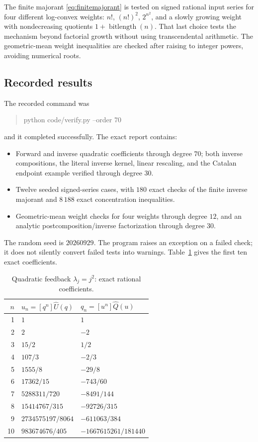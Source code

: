 \documentclass[11pt,a4paper]{article}
\numberwithin{equation}{section}
\theoremstyle{definition}
\theoremstyle{remark}
\newcommand{\Q}{\widehat Q}
\newcommand{\U}{\widehat U}
\begin{document}
The finite majorant \eqref{eq:finitemajorant} is tested on signed rational
input series for four different log-convex weights: $n!$, $(n!)^2$,
$2^{n^2}$, and a slowly growing weight with nondecreasing quotients
$1+\operatorname{bitlength}(n)$. That last choice tests the mechanism
beyond factorial growth without using transcendental arithmetic.
The geometric-mean weight inequalities are checked after raising to
integer powers, avoiding numerical roots.

\subsection{Recorded results}

The recorded command was
\begin{quote}\ttfamily
python code/verify.py --order 70
\end{quote}
and it completed successfully. The exact report contains:
\begin{itemize}
\item Forward and inverse quadratic coefficients through degree $70$;
both inverse compositions, the literal inverse kernel, linear rescaling,
and the Catalan endpoint example verified through degree $30$.
\item Twelve seeded signed-series cases, with $180$ exact checks of the
finite inverse majorant and $8\,188$ exact concentration inequalities.
\item Geometric-mean weight checks for four weights through degree $12$,
and an analytic postcomposition/inverse factorization through degree $30$.
\end{itemize}
The random seed is $20260929$. The program raises an exception on a failed
check; it does not silently convert failed tests into warnings.
Table~\ref{tab:coefficients} gives the first ten exact coefficients.

\begin{table}[htbp]
\centering
\begin{tabular}{rll}
\toprule
$n$ & $u_n=[q^n]\U(q)$ & $q_n=[u^n]\Q(u)$\\
\midrule
1 & $1$ & $1$ \\
2 & $2$ & $-2$ \\
3 & $15/2$ & $1/2$ \\
4 & $107/3$ & $-2/3$ \\
5 & $1555/8$ & $-29/8$ \\
6 & $17362/15$ & $-743/60$ \\
7 & $5288311/720$ & $-8491/144$ \\
8 & $15414767/315$ & $-92726/315$ \\
9 & $2734575197/8064$ & $-611063/384$ \\
10 & $983674676/405$ & $-1667615261/181440$ \\
\bottomrule
\end{tabular}
\caption{Quadratic feedback $\lambda_j=j^2$: exact rational coefficients.}
\label{tab:coefficients}
\end{table}
\end{document}
